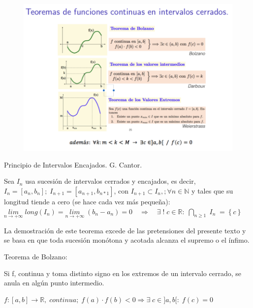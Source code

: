 		\begin{figure}[H]
			\centering
			\includegraphics[width=1\textwidth]{imagenes/imagenes03/T03IM12.png}
		\end{figure}
	

	\begin{teor}{Principio de Intervalos Encajados. G. Cantor}.
	
	Sea $I_n$ usa sucesión de intervalos cerrados y encajados, es decir, $I_n=[a_n,b_n];\; I_{n+1}=[a_{n+1},b_{n*1}]$, con $I_{n+1} \subset I_n,; \forall n\in \mathbb N$ y tales que su longitud tiende a cero (se hace cada vez más pequeña): $\underset {n \to +\infty}{lim}\;{long(I_n)} = \underset {n \to +\infty}{lim}\;{(b_n-a_n)} = 0 \quad \Rightarrow \quad \exists \;!\; c\in \mathbb R: \; \underset { n\ge 1 }{ \bigcap  } { \; I_{ n } \; }=\left\{ c \right\} $
		
	\end{teor}
	
	La demostración de este teorema excede de las pretensiones del presente texto y se basa en que toda sucesión monótona y acotada alcanza el supremo o el ínfimo.
	
	
	
	\begin{teor}Teorema de Bolzano: 
		
	
Si f, continua y toma distinto signo en los extremos de un intervalo cerrado, se anula en algún punto intermedio.



 $f : [a,b] \to  \mathbb R,\; continua; \; f(a)\cdot f(b)<0 \Rightarrow \exists \; c \in ]a,b[: \; f(c)=0$ 

	\end{teor}


